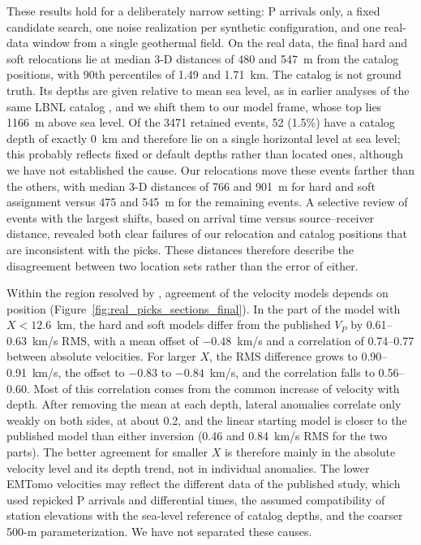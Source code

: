 \documentclass[12pt, a4paper]{article}
\begin{document}
These results hold for a deliberately narrow setting: P arrivals only, a fixed candidate search, one noise realization per synthetic configuration, and one real-data window from a single geothermal field. On the real data, the final hard and soft relocations lie at median 3-D distances of 480 and 547~m from the catalog positions, with 90th percentiles of 1.49 and 1.71~km. The catalog is not ground truth. Its depths are given relative to mean sea level, as in earlier analyses of the same LBNL catalog \parencite{johnson2016}, and we shift them to our model frame, whose top lies 1166~m above sea level. Of the 3471 retained events, 52 (1.5\%) have a catalog depth of exactly 0~km and therefore lie on a single horizontal level at sea level; this probably reflects fixed or default depths rather than located ones, although we have not established the cause. Our relocations move these events farther than the others, with median 3-D distances of 766 and 901~m for hard and soft assignment versus 475 and 545~m for the remaining events. A selective review of events with the largest shifts, based on arrival time versus source--receiver distance, revealed both clear failures of our relocation and catalog positions that are inconsistent with the picks. These distances therefore describe the disagreement between two location sets rather than the error of either.

Within the region resolved by \textcite{guo2021geysers}, agreement of the velocity models depends on position (Figure~\ref{fig:real_picks_sections_final}). In the part of the model with $X<12.6$~km, the hard and soft models differ from the published $V_P$ by 0.61--0.63~km/s RMS, with a mean offset of $-0.48$~km/s and a correlation of 0.74--0.77 between absolute velocities. For larger $X$, the RMS difference grows to 0.90--0.91~km/s, the offset to $-0.83$ to $-0.84$~km/s, and the correlation falls to 0.56--0.60. Most of this correlation comes from the common increase of velocity with depth. After removing the mean at each depth, lateral anomalies correlate only weakly on both sides, at about 0.2, and the linear starting model is closer to the published model than either inversion (0.46 and 0.84~km/s RMS for the two parts). The better agreement for smaller $X$ is therefore mainly in the absolute velocity level and its depth trend, not in individual anomalies. The lower EMTomo velocities may reflect the different data of the published study, which used repicked P arrivals and differential times, the assumed compatibility of station elevations with the sea-level reference of catalog depths, and the coarser 500-m parameterization. We have not separated these causes.
\end{document}
